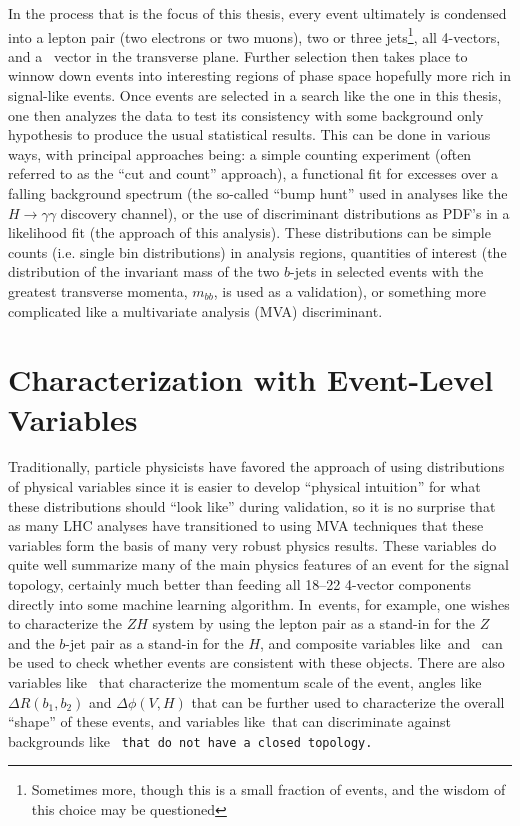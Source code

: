 In the process that is the focus of this thesis, every event ultimately is condensed into a lepton pair (two electrons or two muons), two or three jets\footnote{Sometimes more, though this is a small fraction of events, and the wisdom of this choice may be questioned}, all 4-vectors, and a \met\, vector in the transverse plane.  Further selection then takes place to winnow down events into interesting regions of phase space hopefully more rich in signal-like events.  Once events are selected in a search like the one in this thesis, one then analyzes the data to test its consistency with some background only hypothesis to produce the usual statistical results.  This can be done in various ways, with principal approaches being: a simple counting experiment (often referred to as the ``cut and count'' approach), a functional fit for excesses over a falling background spectrum (the so-called ``bump hunt'' used in analyses like the $H\to\gamma\gamma$ discovery channel), or the use of discriminant distributions as PDF's in a likelihood fit (the approach of this analysis).  These distributions can be simple counts (i.e. single bin distributions) in analysis regions, quantities of interest (the distribution of the invariant mass of the two $b$-jets in selected events with the greatest transverse momenta, $m_{bb}$, is used as a validation), or something more complicated like a multivariate analysis (MVA) discriminant.

\section{Characterization with Event-Level Variables}
Traditionally, particle physicists have favored the approach of using distributions of physical variables since it is easier to develop ``physical intuition'' for what these distributions should ``look like'' during validation, so it is no surprise that as many LHC analyses have transitioned to using MVA techniques that these variables form the basis of many very robust physics results.  These variables do quite well summarize many of the main physics features of an event for the signal topology, certainly much better than feeding all 18--22 4-vector components directly into some machine learning algorithm.  In \ZH\,events, for example, one wishes to characterize the $ZH$ system by using the lepton pair as a stand-in for the $Z$ and the $b$-jet pair as a stand-in for the $H$, and composite variables like \mbb\,and \mll\, can be used to check whether events are consistent with these objects.  There are also variables like \ptv\, that characterize the momentum scale of the event, angles like $\Delta R\left(b_1,b_2\right)$ and $\Delta\phi\left(V,H\right)$ that can be further used to characterize the overall ``shape'' of these events, and variables like \met\,that can discriminate against backgrounds like \tt\,that do not have a closed topology.


